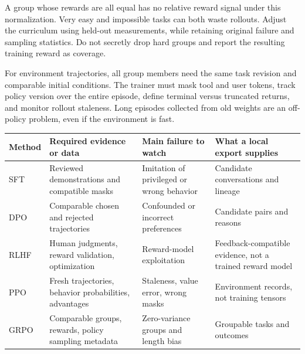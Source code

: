 \documentclass[
  11pt,
  letterpaper,
]{article}
\newcounter{none} %
\begin{document}
A group whose rewards are all equal has no relative reward signal under
this normalization. Very easy and impossible tasks can both waste
rollouts. Adjust the curriculum using held-out measurements, while
retaining original failure and sampling statistics. Do not secretly drop
hard groups and report the resulting training reward as coverage.

For environment trajectories, all group members need the same task
revision and comparable initial conditions. The trainer must mask tool
and user tokens, track policy version over the entire episode, define
terminal versus truncated returns, and monitor rollout staleness. Long
episodes collected from old weights are an off-policy problem, even if
the environment is fast.

{\def\LTcaptype{none} %
\begin{longtable}[]{@{}
  >{\raggedright\arraybackslash}p{}
  >{\raggedright\arraybackslash}p{}
  >{\raggedright\arraybackslash}p{}
  >{\raggedright\arraybackslash}p{}@{}}
\toprule\noalign{}
\begin{minipage}[b]{\linewidth}\raggedright
Method
\end{minipage} & \begin{minipage}[b]{\linewidth}\raggedright
Required evidence or data
\end{minipage} & \begin{minipage}[b]{\linewidth}\raggedright
Main failure to watch
\end{minipage} & \begin{minipage}[b]{\linewidth}\raggedright
What a local export supplies
\end{minipage} \\
\midrule\noalign{}
\endhead
\bottomrule\noalign{}
\endlastfoot
SFT & Reviewed demonstrations and compatible masks & Imitation of
privileged or wrong behavior & Candidate conversations and lineage \\
DPO & Comparable chosen and rejected trajectories & Confounded or
incorrect preferences & Candidate pairs and reasons \\
RLHF & Human judgments, reward validation, optimization & Reward-model
exploitation & Feedback-compatible evidence, not a trained reward
model \\
PPO & Fresh trajectories, behavior probabilities, advantages &
Staleness, value error, wrong masks & Environment records, not training
tensors \\
GRPO & Comparable groups, rewards, policy sampling metadata &
Zero-variance groups and length bias & Groupable tasks and outcomes \\
\end{longtable}
}
\end{document}
